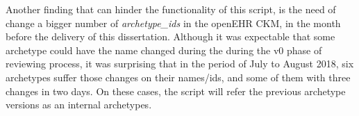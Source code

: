 \documentclass[mim_thesis.tex]{subfiles}
\begin{document}
Another finding that can hinder the functionality of this script, is the need of change a bigger number of \textit{archetype\_ids} in the openEHR CKM, in the month before the delivery of this dissertation. Although it was expectable that some archetype could have the name changed during the during the v0 phase of reviewing process, it was surprising that in the period of July to August 2018, six archetypes suffer those changes on their names/ids, and some of them with three changes in two days. On these cases, the script will refer the previous archetype versions as an internal archetypes. 
\end{document}

